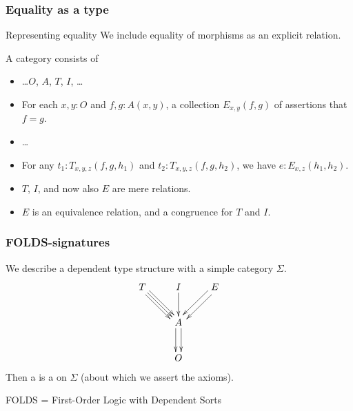 \documentclass{beamer}
\begin{document}
\begin{frame}[t]
  \frametitle{Equality as a type}
  \begin{block}{Representing equality}
    We include \alert{equality of morphisms} as an explicit relation.
  \end{block}
  A category consists of
  \begin{itemize}
  \item \dots $O$, $A$, $T$, $I$, \dots
  \item For each $x,y:O$ and $f,g:A(x,y)$, a collection $E_{x,y}(f,g)$ of \alert{assertions that $f=g$}.
  \item \dots
    \pause
  \item For any $t_1:T_{x,y,z}(f,g,h_1)$ and $t_2:T_{x,y,z}(f,g,h_2)$, we have $e : E_{x,z}(h_1,h_2)$.
    \pause
  \item $T$, $I$, and now also $E$ are mere relations.
  \item $E$ is an equivalence relation, and a congruence for $T$ and $I$.
  \end{itemize}
\end{frame}

\begin{frame}
  \frametitle{FOLDS-signatures}
  We describe a dependent type structure with a \alert{simple category} $\Sigma$.
  \[
  \vcenter{\xymatrix{
      T \ar[dr] \ar@<1mm>[dr] \ar@<-1mm>[dr] & I \ar[d] & E \ar@<1mm>[dl] \ar@<-1mm>[dl] \\
      & A \ar@<1mm>[d] \ar@<-1mm>[d] \\
      & O}}
  \]
  Then a  is a  on $\Sigma$ (about which we assert the axioms).

  \medskip
  \alert{FOLDS} = \alert{F}irst-\alert{O}rder \alert{L}ogic with \alert{D}ependent \alert{S}orts
\end{frame}
\end{document}
